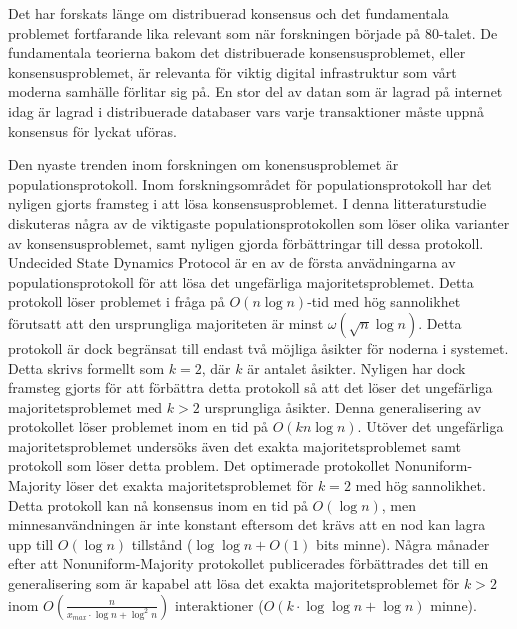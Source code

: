 \documentclass[english, 12pt, a4paper, sci, utf8, a-1b, online]{aaltothesis}
\theoremstyle{definition}
\theoremstyle{remark}
\begin{document}
\begin{abstractpage}[swedish]
Det har forskats länge om distribuerad konsensus och det fundamentala problemet fortfarande lika relevant som när forskningen började på 80-talet. De fundamentala teorierna bakom det distribuerade konsensusproblemet, eller konsensusproblemet, är relevanta för viktig digital infrastruktur som vårt moderna samhälle förlitar sig på. En stor del av datan som är lagrad på internet idag är lagrad i distribuerade databaser vars varje transaktioner måste uppnå konsensus för lyckat uföras. 

Den nyaste trenden inom forskningen om konensusproblemet är populationsprotokoll. Inom forskningsområdet för populationsprotokoll har det nyligen gjorts framsteg i att lösa konsensusproblemet. I denna litteraturstudie diskuteras några av de viktigaste populationsprotokollen som löser olika varianter av konsensusproblemet, samt nyligen gjorda förbättringar till dessa protokoll. Undecided State Dynamics Protocol är en av de första anvädningarna av populationsprotokoll för att lösa det ungefärliga majoritetsproblemet. Detta protokoll löser problemet i fråga på $O(n \log n)$-tid med hög sannolikhet förutsatt att den ursprungliga majoriteten är minst $\omega(\sqrt{n} \log n)$. Detta protokoll är dock begränsat till endast två möjliga åsikter för noderna i systemet. Detta skrivs formellt som $k = 2$, där $k$ är antalet åsikter. Nyligen har dock framsteg gjorts för att förbättra detta protokoll så att det löser det ungefärliga majoritetsproblemet med $k > 2$ ursprungliga åsikter. Denna generalisering av protokollet löser problemet inom en tid på $O(kn \log n)$. Utöver det ungefärliga majoritetsproblemet undersöks även det exakta majoritetsproblemet samt protokoll som löser detta problem. Det optimerade protokollet Nonuniform-Majority löser det exakta majoritetsproblemet för $k = 2$ med hög sannolikhet. Detta protokoll kan nå konsensus inom en tid på $O(\log n)$, men minnesanvändningen är inte konstant eftersom det krävs att en nod kan lagra upp till $O(\log n)$ tillstånd ($\log \log n + O(1)$ bits minne). Några månader efter att Nonuniform-Majority protokollet publicerades förbättrades det till en generalisering som är kapabel att lösa det exakta majoritetsproblemet för $k > 2$ inom $O(\frac{n}{x_{max} \cdot \log n + \log^2 n})$ interaktioner ($O(k \cdot \log \log n + \log n)$ minne). 

\end{abstractpage}
\end{document}
